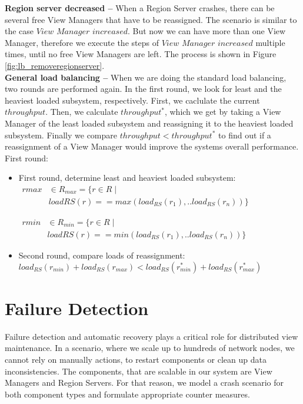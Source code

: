 \documentclass[11pt,a4paper,bibtotoc,idxtotoc,headsepline,footsepline,footexclude,BCOR12mm,DIV13]{scrbook}
\begin{document}
\noindent  
\textbf{Region server decreased -- }When a Region Server crashes, there can be several free View Managers that have to be reassigned. The scenario is similar to the case $View$ $Manager$ $increased$. But now we can have more than one View Manager, therefore we execute the steps of $View$ $Manager$ $increased$ multiple times, until no free View Managers are left. The process is shown in Figure \ref{fig:lb_removeregionserver}.\\

\noindent  
\textbf{General load balancing -- }When we are doing the standard load balancing, two rounds are performed again. In the first round, we look for least and the heaviest loaded subsystem, respectively. First, we caclulate the current $throughput$. Then, we calculate $throughput^*$, which we get by taking a View Manager of the least loaded subsystem and reassigning it to the heaviest loaded subsystem. Finally we compare $throughput < throughput^*$ to find out if a reassignment of a View Manager would improve the systems overall performance.   
First round:\\

\begin{itemize}
	\item First round, determine least and heaviest loaded subsystem:\\
$\begin{array}{ll} rmax & \in R_{max}  =\{r \in R \mid\\& loadRS(r)== max(load_{RS}(r_1),..load_{RS}(r_n))\} \end{array}$

$\begin{array}{ll} rmin & \in R_{min}  =\{r \in R \mid\\& loadRS(r)== min(load_{RS}(r_1),..load_{RS}(r_n))\} \end{array}$
	\item Second round, compare loads of reassignment:\\
$load_{RS}(r_{min}) + load_{RS}(r_{max}) < load_{RS}(r_{min}^*) + load_{RS}(r_{max}^*)$
\end{itemize}

\chapter{Failure Detection}
\label{chap:failuredetection}

Failure detection and automatic recovery plays a critical role for distributed view maintenance. In a scenario, where we scale up to hundreds of network nodes, we cannot rely on manually actions, to restart components or clean up data inconsistencies. The components, that are scalable in our system are View Managers and Region Servers. For that reason, we model a crash scenario for both component types and formulate appropriate counter measures.\\
 
\end{document}
